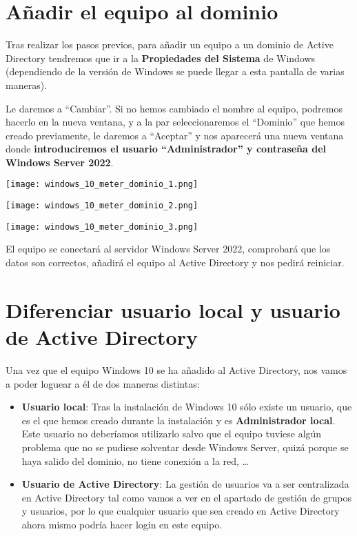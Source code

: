 \section{Añadir el equipo al dominio}
Tras realizar los pasos previos, para añadir un equipo a un dominio de Active Directory tendremos que ir a la \textbf{Propiedades del Sistema} de Windows (dependiendo de la versión de Windows se puede llegar a esta pantalla de varias maneras).

Le daremos a “Cambiar”. Si no hemos cambiado el nombre al equipo, podremos hacerlo en la nueva ventana, y a la par seleccionaremos el “Dominio” que hemos creado previamente, le daremos a “Aceptar” y nos aparecerá una nueva ventana donde \textbf{introduciremos el usuario “Administrador” y contraseña del Windows Server 2022}.

{
    \begin{minipage}{0.3\linewidth}
        \texttt{[image: windows\_10\_meter\_dominio\_1.png]}
    \end{minipage}
    \hfill
    \begin{minipage}{0.3\linewidth}
        \texttt{[image: windows\_10\_meter\_dominio\_2.png]}
    \end{minipage}
    \hfill
    \begin{minipage}{0.3\linewidth}
        \texttt{[image: windows\_10\_meter\_dominio\_3.png]}
    \end{minipage}
}

El equipo se conectará al servidor Windows Server 2022, comprobará que los datos son correctos, añadirá el equipo al Active Directory y nos pedirá reiniciar.


\section{Diferenciar usuario local y usuario de Active Directory}
Una vez que el equipo Windows 10 se ha añadido al Active Directory, nos vamos a poder loguear a él de dos maneras distintas:

\begin{itemize}
    \item \textbf{Usuario local}: Tras la instalación de Windows 10 sólo existe un usuario, que es el que hemos creado durante la instalación y es \textbf{Administrador local}. Este usuario no deberíamos utilizarlo salvo que el equipo tuviese algún problema que no se pudiese solventar desde Windows Server, quizá porque se haya salido del dominio, no tiene conexión a la red, …
    \item \textbf{Usuario de Active Directory}: La gestión de usuarios va a ser centralizada en Active Directory tal como vamos a ver en el apartado de gestión de grupos y usuarios, por lo que cualquier usuario que sea creado en Active Directory ahora mismo podría hacer login en este equipo.
\end{itemize}

